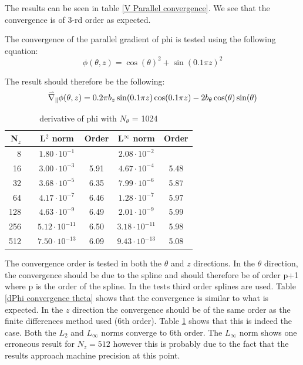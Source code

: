 The results can be seen in table \ref{V Parallel convergence}. We see that the convergence is of 3-rd order as expected.

The convergence of the parallel gradient of phi is tested using the following equation:
\begin{equation}
 \phi(\theta,z)= \cos(\theta)^2 + \sin(0.1\pi z)^2
\end{equation}

The result should therefore be the following:
\begin{equation}
 \accentset{\rightharpoonup}{\nabla}_\parallel\phi(\theta,z) = 0.2\pi b_z\sin(0.1\pi z)\cos(0.1\pi z) - 2 b_\theta \cos(\theta)\sin(\theta)
\end{equation}

\begin{table}[ht]
\centering
 \begin{tabular}{|r c|c|c|c|c|}
  \hline
  \bf N$_z$ & & \bf L$^2$ norm       & \bf Order & \bf L$^\infty$ norm  & \bf Order\\
  \hline
  8  & & $ 1.80 \cdot 10^{ -1 }$ &       & $ 2.08 \cdot 10^{ -2 }$ &        \\
  \hline
  16  & & $ 3.00 \cdot 10^{ -3 }$ &  5.91  & $ 4.67 \cdot 10^{ -4 }$ &  5.48  \\
  \hline
  32  & & $ 3.68 \cdot 10^{ -5 }$ &  6.35  & $ 7.99 \cdot 10^{ -6 }$ &  5.87  \\
  \hline
  64  & & $ 4.17 \cdot 10^{ -7 }$ &  6.46  & $ 1.28 \cdot 10^{ -7 }$ &  5.97  \\
  \hline
  128  & & $ 4.63 \cdot 10^{ -9 }$ &  6.49  & $ 2.01 \cdot 10^{ -9 }$ &  5.99  \\
  \hline
  256  & & $ 5.12 \cdot 10^{ -11 }$ &  6.50  & $ 3.18 \cdot 10^{ -11 }$ &  5.98  \\
  \hline
  512  & & $ 7.50 \cdot 10^{ -13 }$ &  6.09  & $ 9.43 \cdot 10^{ -13 }$ &  5.08  \\
  \hline
 \end{tabular}
 \caption{\label{dPhi convergence z} derivative of phi with $N_\theta$ = 1024}
\end{table}

The convergence order is tested in both the $\theta$ and $z$ directions. In the $\theta$ direction, the convergence should be due to the spline and should therefore be of order p+1 where p is the order of the spline. In the tests third order splines are used. Table \ref{dPhi convergence theta} shows that the convergence is similar to what is expected. In the $z$ direction the convergence should be of the same order as the finite differences method used (6th order). Table \ref{dPhi convergence z} shows that this is indeed the case. Both the $L_2$ and $L_\infty$ norms converge to 6th order. The $L_\infty$ norm shows one erroneous result for $N_z=512$ however this is probably due to the fact that the results approach machine precision at this point.

